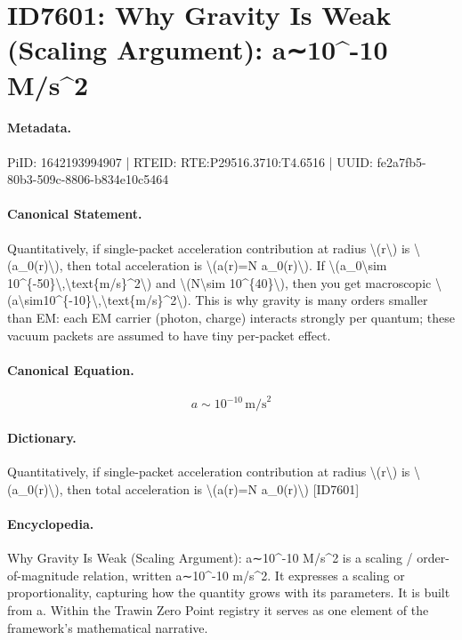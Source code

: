 \section*{ID7601: Why Gravity Is Weak (Scaling Argument): a∼10\textasciicircum{}-10 M/s\textasciicircum{}2}
\paragraph{Metadata.}
PiID: 1642193994907 | RTEID: RTE:P29516.3710:T4.6516 | UUID: fe2a7fb5-80b3-509c-8806-b834e10c5464

\paragraph{Canonical Statement.}
Quantitatively, if single-packet acceleration contribution at radius \textbackslash{}(r\textbackslash{}) is \textbackslash{}(a\_0(r)\textbackslash{}), then total acceleration is \textbackslash{}(a(r)=N a\_0(r)\textbackslash{}). If \textbackslash{}(a\_0\textbackslash{}sim 10\textasciicircum{}\{-50\}\textbackslash{},\textbackslash{}text\{m/s\}\textasciicircum{}2\textbackslash{}) and \textbackslash{}(N\textbackslash{}sim 10\textasciicircum{}\{40\}\textbackslash{}), then you get macroscopic \textbackslash{}(a\textbackslash{}sim10\textasciicircum{}\{-10\}\textbackslash{},\textbackslash{}text\{m/s\}\textasciicircum{}2\textbackslash{}). This is why gravity is many orders smaller than EM: each EM carrier (photon, charge) interacts strongly per quantum; these vacuum packets are assumed to have tiny per-packet effect.

\paragraph{Canonical Equation.}
\[
a\sim10^{-10}\,\text{m/s}^2
\]

\paragraph{Dictionary.}
Quantitatively, if single-packet acceleration contribution at radius \textbackslash{}(r\textbackslash{}) is \textbackslash{}(a\_0(r)\textbackslash{}), then total acceleration is \textbackslash{}(a(r)=N a\_0(r)\textbackslash{}) [ID7601]

\paragraph{Encyclopedia.}
Why Gravity Is Weak (Scaling Argument): a∼10\textasciicircum{}-10 M/s\textasciicircum{}2 is a scaling / order-of-magnitude relation, written a∼10\textasciicircum{}-10 m/s\textasciicircum{}2. It expresses a scaling or proportionality, capturing how the quantity grows with its parameters. It is built from a. Within the Trawin Zero Point registry it serves as one element of the framework's mathematical narrative.

